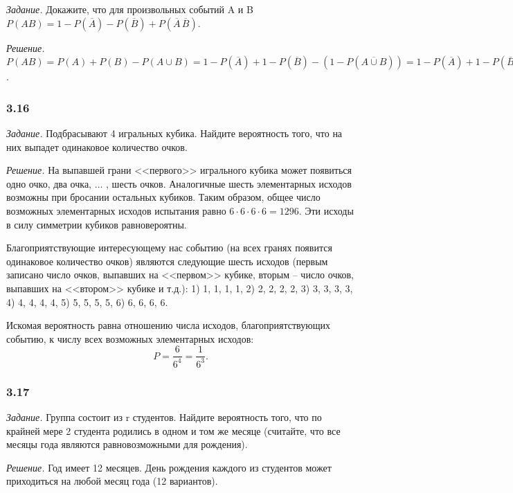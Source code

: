 \documentclass{book}
\begin{document}
\textit{Задание.} Докажите, что для произвольных событий A и B $P(AB)=1-P\left(\overline{A}\right)-P\left(\overline{B}\right)+P\left(\overline{A}\,\overline{B}\right)$.

\textit{Решение.} $P(AB)=P(A)+P(B)-P\left(A\cup B\right)=1-P\left(\overline{A}\right)+1-P\left(\overline{B}\right)-\left(1-P\left(\overline{A\cup B}\right)\right)=1-P\left(\overline{A}\right)+1-P\left(\overline{B}\right)-1+P\left(\overline{A}\,\overline{B}\right)=1-P\left(\overline{A}\right)-P\left(\overline{B}\right)+P\left(\overline{A}\,\overline{B}\right)$.

\subsubsection*{3.16}

\textit{Задание.} Подбрасывают 4 игральных кубика. Найдите вероятность того, что на них выпадет одинаковое количество очков.

\textit{Решение.} На выпавшей грани <<первого>> игрального кубика может появиться одно очко, два очка,  $\dotsc$ , шесть очков. Аналогичные шесть элементарных исходов возможны при бросании остальных кубиков. Таким образом, общее число возможных элементарных исходов испытания равно $6\cdot 6\cdot 6\cdot 6=1296$. Эти исходы в силу симметрии кубиков равновероятны.

Благоприятствующие интересующему нас событию (на всех гранях появится одинаковое количество очков) являются следующие шесть исходов (первым записано число очков, выпавших на <<первом>> кубике, вторым -- число очков, выпавших на <<втором>> кубике и т.д.): 1) 1, 1, 1, 1, 2) 2, 2, 2, 2, 3) 3, 3, 3, 3, 4) 4, 4, 4, 4, 5) 5, 5, 5, 5, 6) 6, 6, 6, 6.

Искомая вероятность равна отношению числа исходов, благоприятствующих событию, к числу всех возможных элементарных исходов: $$P=\frac{6}{6^4}=\frac{1}{6^3}.$$

\subsubsection*{3.17}

\textit{Задание.} Группа состоит из r студентов. Найдите вероятность того, что по крайней мере 2 студента родились в одном и том же месяце (считайте, что все месяцы года являются равновозможными для рождения).

\textit{Решение.} Год имеет 12 месяцев. День рождения каждого из студентов может приходиться на любой месяц года (12 вариантов).
\end{document}
